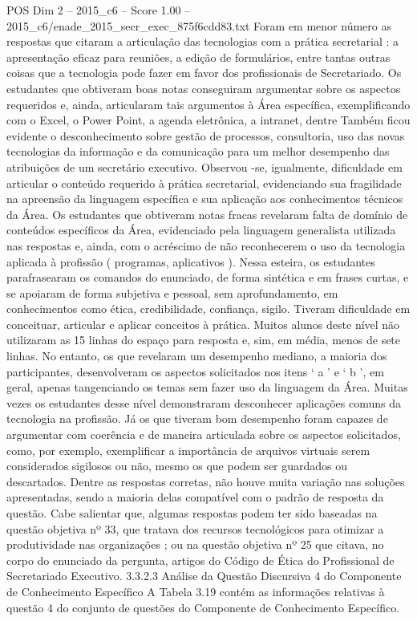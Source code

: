 \begin{textsample}{POS Dim 2 – 2015\_c6 – Score 1.00 – 2015\_c6/enade\_2015\_secr\_exec\_875f6cdd83.txt}
Foram em menor número as respostas que citaram a articulação das tecnologias com a prática secretarial : a apresentação eficaz para reuniões, a edição de formulários, entre tantas outras coisas que a tecnologia pode fazer em favor dos profissionais de Secretariado.
Os estudantes que obtiveram boas notas conseguiram argumentar sobre os aspectos requeridos e, ainda, articularam tais argumentos à Área específica, exemplificando com o Excel, o Power Point, a agenda eletrônica, a intranet, dentre Também ficou evidente o desconhecimento sobre gestão de processos, consultoria, uso das novas tecnologias da informação e da comunicação para um melhor desempenho das atribuições de um secretário executivo.
Observou -se, igualmente, dificuldade em articular o conteúdo requerido à prática secretarial, evidenciando sua fragilidade na apreensão da linguagem específica e sua aplicação aos conhecimentos técnicos da Área.
Os estudantes que obtiveram notas fracas revelaram falta de domínio de conteúdos específicos da Área, evidenciado pela linguagem generalista utilizada nas respostas e, ainda, com o acréscimo de não reconhecerem o uso da tecnologia aplicada à profissão ( programas, aplicativos ).
Nessa esteira, os estudantes parafrasearam os comandos do enunciado, de forma sintética e em frases curtas, e se apoiaram de forma subjetiva e pessoal, sem aprofundamento, em conhecimentos como ética, credibilidade, confiança, sigilo.
Tiveram dificuldade em conceituar, articular e aplicar conceitos à prática.
Muitos alunos deste nível não utilizaram as 15 linhas do espaço para resposta e, sim, em média, menos de sete linhas.
No entanto, os que revelaram um desempenho mediano, a maioria dos participantes, desenvolveram os aspectos solicitados nos itens ‘ a ’ e ‘ b ’, em geral, apenas tangenciando os temas sem fazer uso da linguagem da Área.
Muitas vezes os estudantes desse nível demonstraram desconhecer aplicações comuns da tecnologia na profissão.
Já os que tiveram bom desempenho foram capazes de argumentar com coerência e de maneira articulada sobre os aspectos solicitados, como, por exemplo, exemplificar a importância de arquivos virtuais serem considerados sigilosos ou não, mesmo os que podem ser guardados ou descartados.
Dentre as respostas corretas, não houve muita variação nas soluções apresentadas, sendo a maioria delas compatível com o padrão de resposta da questão.
Cabe salientar que, algumas respostas podem ter sido baseadas na questão objetiva nº 33, que tratava dos recursos tecnológicos para otimizar a produtividade nas organizações ; ou na questão objetiva nº 25 que citava, no corpo do enunciado da pergunta, artigos do Código de Ética do Profissional de Secretariado Executivo. 3.3.2.3 Análise da Questão Discursiva 4 do Componente de Conhecimento Específico A Tabela 3.19 contém as informações relativas à questão 4 do conjunto de questões do Componente de Conhecimento Específico.

\end{textsample}
